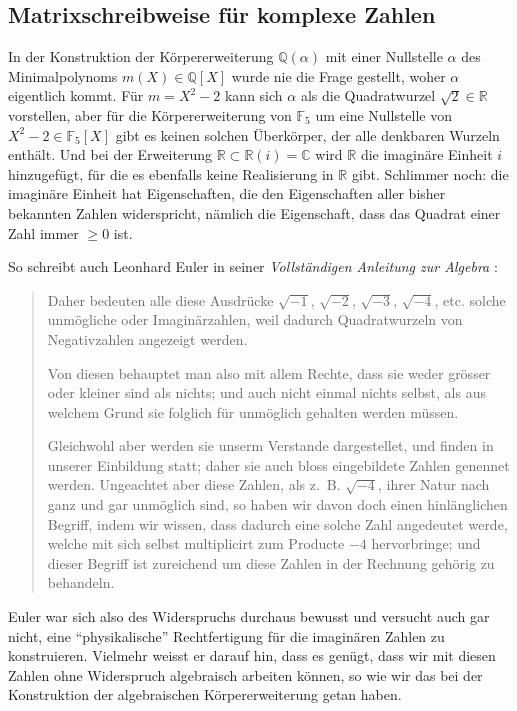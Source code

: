 %
%
%
\subsection{Matrixschreibweise für komplexe Zahlen
\label{buch:komplex:subsection:matrixschreibweise}}
In der Konstruktion der Körpererweiterung $\mathbb{Q}(\alpha)$
mit einer Nullstelle $\alpha$ des Minimalpolynoms $m(X)\in\mathbb{Q}[X]$ 
wurde nie die Frage gestellt, woher $\alpha$ eigentlich kommt.
Für $m=X^2-2$ kann sich $\alpha$ als die Quadratwurzel
$\!\sqrt{2}\in\mathbb{R}$ vorstellen, aber für die Körpererweiterung
von $\mathbb{F}_5$ um eine Nullstelle von $X^2-2\in\mathbb{F}_5[X]$
gibt es keinen solchen Überkörper, der alle denkbaren Wurzeln
enthält.
Und bei der Erweiterung $\mathbb{R}\subset \mathbb{R}(i)=\mathbb{C}$
wird $\mathbb{R}$ die imaginäre Einheit $i$ hinzugefügt, für die es
ebenfalls keine Realisierung in $\mathbb{R}$ gibt.
Schlimmer noch: die imaginäre Einheit hat Eigenschaften, die den 
Eigenschaften aller bisher bekannten Zahlen widerspricht, nämlich
die Eigenschaft, dass das Quadrat einer Zahl immer $\ge 0$ ist.

So schreibt auch Leonhard Euler in seiner \emph{Vollständigen
Anleitung zur Algebra}
%
\cite[S.~61,  Abschnitt~144--145]{buch:euler-algebra}:
\begin{quote}
Daher bedeuten alle diese Ausdrücke $\!\sqrt{-1}$, $\!\sqrt{-2}$,
$\!\sqrt{-3}$, $\!\sqrt{-4}$, etc. solche unmögliche oder
Imaginärzahlen, weil dadurch Quadratwurzeln von Negativzahlen
angezeigt werden.

Von diesen behauptet man also mit allem Rechte, dass sie weder
grösser oder kleiner sind als nichts; und auch nicht einmal nichts
selbst, als aus welchem Grund sie folglich für unmöglich gehalten
werden müssen.

Gleichwohl aber werden sie unserm Verstande dargestellet, und finden
in unserer Einbildung statt; daher sie auch bloss eingebildete
Zahlen genennet werden.
Ungeachtet aber diese Zahlen, als z.~B. $\!\sqrt{-4}$, ihrer Natur
nach ganz und gar unmöglich sind, so haben wir davon doch einen
hinlänglichen Begriff, indem wir wissen, dass dadurch eine solche
Zahl angedeutet werde, welche mit sich selbst multiplicirt zum
Producte $-4$ hervorbringe; und dieser Begriff ist zureichend um diese
Zahlen in der Rechnung gehörig zu behandeln.
\end{quote}
Euler war sich also des Widerspruchs durchaus bewusst und versucht
auch gar nicht, eine ``physikalische'' Rechtfertigung für die
imaginären Zahlen zu konstruieren.
Vielmehr weisst er darauf hin, dass es genügt, dass wir mit diesen
Zahlen ohne Widerspruch algebraisch arbeiten können, so wie wir
das bei der Konstruktion der algebraischen Körpererweiterung getan
haben.

